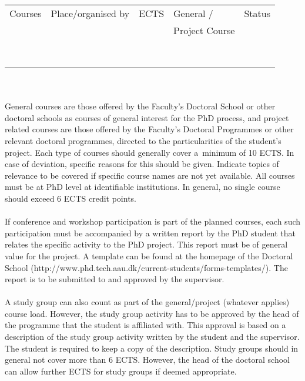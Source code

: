 \begin{tabular}{|p{5cm}|l|l|l|l|}
\hline
   \centering Courses  & Place/organised by & ECTS & General / & Status \\
   & & & Project Course & \\
   \hline
   
\rowcolor{lightestblue} \bf  & & & & \\ 
& & & & \\
\rowcolor{lightestblue} \bf  & & & & \\ 
& & & & \\
\rowcolor{lightestblue} \bf  & & & & \\ 
& & & & \\
\rowcolor{lightestblue} \bf  & & & & \\ 
& & & &\\
    \hline
\end{tabular}
\\
\\
General courses are those offered by the Faculty’s Doctoral School or other doctoral schools as courses of general interest for the PhD process, and project related courses are those offered by the Faculty’s Doctoral Programmes or other relevant doctoral programmes, directed to the particularities of the student’s project. Each type of courses should generally cover a minimum of 10 ECTS. In case of deviation, specific reasons for this should be given. Indicate topics of relevance to be covered if specific course names are not yet available. All courses must be at PhD level at identifiable institutions. In general, no single course should exceed 6 ECTS credit points.
\\
\\
If conference and workshop participation is part of the planned courses, each such participation must be accompanied by a written report by the PhD student that relates the specific activity to the PhD project. This report must be of general value for the project. A template can be found at the homepage of the Doctoral School (http://www.phd.tech.aau.dk/current-students/forms-templates/). The report is to be submitted to and approved by the supervisor.
\\
\\
A study group can also count as part of the general/project (whatever applies) course load. However, the study group activity has to be approved by the head of the programme that the student is affiliated with. This approval is based on a description of the study group activity written by the student and the supervisor. The student is required to keep a copy of the description. Study groups should in general not cover more than 6 ECTS. However, the head of the doctoral school can allow further ECTS for study groups if deemed appropriate.
